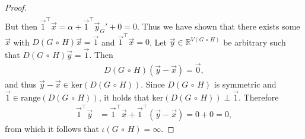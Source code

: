 \documentclass[10pt,a4paper]{amsart}
\newcommand{\Circ}{\circ}
\newcommand{\distmatrix}{D}
\newcommand{\one}{\vec{1}}
\newcommand{\x}{\vec{x}}
\newcommand{\y}{\vec{y}}
\begin{document}
\begin{proof}
\begin{align*}
            \end{align*}
        But then $\one^\top \x = \alpha + \one^\top \y_G' + 0 = 0$. Thus we have shown that there exists some $\x$ with $\distmatrix(G\,\Circ\,H)\x = \one$ and $\one^\top\x = 0$. Let $\y\in\mathbb{R}^{V(G\,\Circ\,H)}$ be arbitrary such that $\distmatrix(G\,\Circ\,H)\y = \one$. Then
            \begin{align*}
                \distmatrix(G\,\Circ\,H)(\y - \x) = \vec{0},
            \end{align*}
        and thus $\y-\x \in \mathrm{ker}(\distmatrix(G\,\Circ\,H))$. Since $\distmatrix(G\,\Circ\,H)$ is symmetric and $\one\in\mathrm{range}(\distmatrix(G\,\Circ\,H))$, it holds that $\mathrm{ker}(\distmatrix(G\,\Circ\,H)) \perp \one$. Therefore
            \begin{align*}
                \one^\top \y &= \one^\top \x + \one^\top (\y - \x) = 0 + 0 = 0,
            \end{align*}
        from which it follows that $\iota(G\,\Circ\,H) = \infty$.
    \end{proof}
\end{document}
